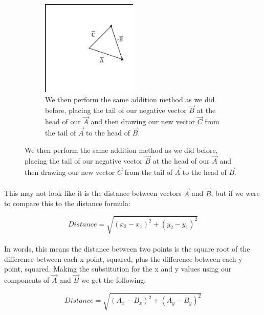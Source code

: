 \documentclass[12pt, letterpaper]{report}
\begin{document}
\begin{figure}[h]
\begin{subfigure}{0.5\textwidth}
		\end{subfigure}
		\begin{subfigure}{0.5\textwidth}
		\centering
		\includegraphics[width=0.5\textwidth]{Processing Images/VectorAddition/2VecSub.jpg}
		\caption{We then perform the same addition method as we did before, placing the tail of our negative vector $\vec{B}$ at the head of our $\vec{A}$ and then drawing our new vector $\vec{C}$ from the tail of $\vec{A}$ to the head of $\vec{B}$.}
		\end{subfigure}
		\end{figure}
		
		\paragraph{} This may not look like it is the distance between vectors $\vec{A}$ and $\vec{B}$, but if we were to compare this to the distance formula:
		
		\begin{equation*}
		Distance = \sqrt{\left(x_2 - x_1\right)^2 + \left(y_2 - y_1\right)^2}
		\end{equation*}
		
		\paragraph{} In words, this means the distance between two points is the square root of the difference between each x point, squared, plus the difference between each y point, squared. Making the substitution for the x and y values using our components of $\vec{A}$ and $\vec{B}$ we get the following:

		\begin{equation*}
		Distance = \sqrt{\left(A_x - B_x\right)^2 + \left(A_y - B_y\right)^2}
		\end{equation*}
		
\end{document}
